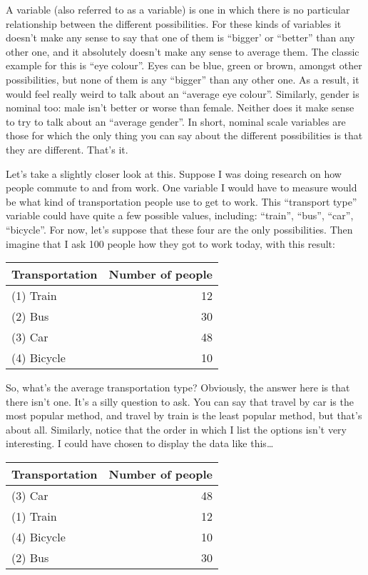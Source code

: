 A  variable (also referred to as a  variable) is one in which there is no particular relationship between the different possibilities. For these kinds of variables it doesn't make any sense to say that one of them is ``bigger' or ``better'' than any other one, and it absolutely doesn't make any sense to average them. The classic example for this is ``eye colour''. Eyes can be blue, green or brown, amongst other possibilities, but none of them is any ``bigger'' than any other one. As a result, it would feel really weird to talk about an ``average eye colour''. Similarly, gender is nominal too: male isn't better or worse than female. Neither does it make sense to try to talk about an ``average gender''. In short, nominal scale variables are those for which the only thing you can say about the different possibilities is that they are different. That's it.

Let's take a slightly closer look at this. Suppose I was doing research on how people commute to and from work. One variable I would have to measure would be what kind of transportation people use to get to work. This ``transport type'' variable could have quite a few possible values, including: ``train'', ``bus'', ``car'', ``bicycle''. For now, let's suppose that these four are the only possibilities. Then imagine  that I ask 100 people how they got to work today, with this result:
 
\vspace*{6pt}
\begin{tabular}{lr}
\hline
Transportation & Number of people \\
\hline
(1) Train     & 12 \\
(2) Bus       & 30 \\
(3) Car       & 48 \\
(4) Bicycle   & 10 \\
\hline
\end{tabular}
\vspace*{6pt}
 

So, what's the average transportation type? Obviously, the answer here is that there isn't one. It's a silly question to ask. You can say that travel by car is the most popular method, and travel by train is the least popular method, but that's about all. Similarly, notice that the order in which I list the options isn't very interesting. I could have chosen to display the data like this\ldots
 
\vspace*{6pt}
\begin{tabular}{lr}
\hline
Transportation & Number of people \\
\hline
(3) Car        & 48 \\
(1) Train      & 12 \\
(4) Bicycle    & 10 \\
(2) Bus        & 30 \\
\hline
\end{tabular}
\vspace*{6pt}
 
